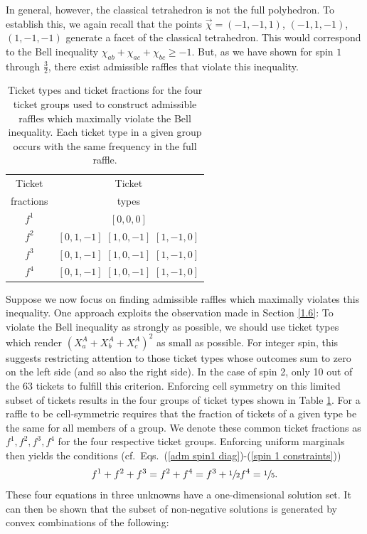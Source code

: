 In general, however, the classical tetrahedron is not the full polyhedron. To establish this, we again recall that the points $\vec{\chi}=(-1,-1,1)$, $(-1,1,-1)$, $(1,-1,-1)$ generate a facet of the classical tetrahedron. This would correspond to the Bell inequality $\chi_{ab}+\chi_{ac}+\chi_{bc}\geq -1$. But, as we have shown for spin $1$ through $\frac32$, there exist admissible raffles that violate this inequality. 
\begin{table}[ht]
\centering
\begin{tabular}{|c|c|}
\hline
Ticket  & Ticket \\
fractions & types \\[.1cm]
\hline
$f^1$ & $[0,0,0]$ \\[.2cm]
$f^2$ & $[0,1,-1]$ $[1,0,-1]$ $[1,-1,0]$ \\[.2cm]
$f^3$ & $[0,1,-1]$ $[1,0,-1]$ $[1,-1,0]$ \\[.2cm]
$f^4$ & $[0,1,-1]$ $[1,0,-1]$ $[1,-1,0]$ \\[.2cm]
\hline
\end{tabular}
\caption{Ticket types and ticket fractions for the four ticket groups used to construct admissible raffles which maximally violate the Bell inequality. Each ticket type in a given group occurs with the same frequency in the full raffle.}
\label{Spin2TicketGroups}
\end{table} 

Suppose we now focus on finding admissible raffles which maximally violates this inequality. One approach exploits the observation made in Section \ref{1.6}: To violate the Bell inequality as strongly as possible, we should use ticket types which render $(X_a^A+X_b^A+X_c^A)^2$ as small as possible. For integer spin, this suggests restricting attention to those ticket types whose outcomes sum to zero on the left side (and so also the right side). In the case of spin 2, only 10 out of the 63 tickets to fulfill this criterion. Enforcing cell symmetry on this limited subset of tickets results in the four groups of ticket types shown in Table \ref{Spin2TicketGroups}. For a raffle to be cell-symmetric requires that the fraction of tickets of a given type be the same for all members of a group. We denote these common ticket fractions as $f^1,f^2,f^3,f^4$ for the four respective ticket groups. Enforcing uniform marginals then yields the conditions (cf.\ Eqs.\ (\ref{adm spin1 diag})-(\ref{spin 1 constraints})) 
$$f^1+f^2+f^3=f^2+f^4=f^3+\sfrac12 f^4=\sfrac15.$$ These four equations in three unknowns have a one-dimensional solution set. It can then be shown that the subset of non-negative solutions is generated by convex combinations of the following:

